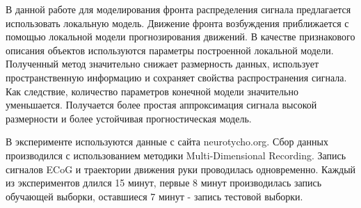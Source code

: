 \documentclass[12pt,twoside]{article}
\begin{document}
В данной работе для моделирования фронта распределения сигнала предлагается использовать локальную модель. Движение фронта возбуждения приближается с помощью локальной модели прогнозирования движений. В качестве признакового описания объектов используются параметры построенной локальной модели. Полученный  метод значительно снижает размерность данных, использует пространственную информацию и сохраняет свойства распространения сигнала.
Как следствие, количество параметров конечной модели значительно уменьшается. Получается более простая аппроксимация сигнала высокой размерности и более устойчивая прогностическая модель.


В эксперименте используются данные с сайта neurotycho.org. Сбор данных производился с использованием методики Multi-Dimensional Recording. Запись сигналов ECoG и траектории движения руки проводилась одновременно. Каждый из экспериментов длился 15 минут, первые 8 минут производилась запись обучающей выборки, оставшиеся 7 минут - запись тестовой выборки. \\\\
\end{document}

